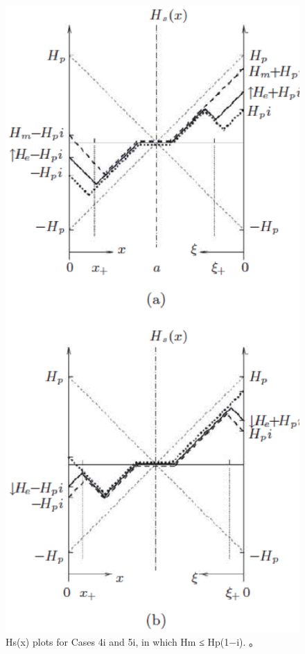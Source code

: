 \begin{figure}[htbp]
	\centering
	\includegraphics[scale=0.7]{chpt7/figs/fig7.15.eps}
	\caption{Hs(x) plots for Cases 4i and
		5i, in which Hm ≤ Hp(1−i). 。}
\end{figure}




